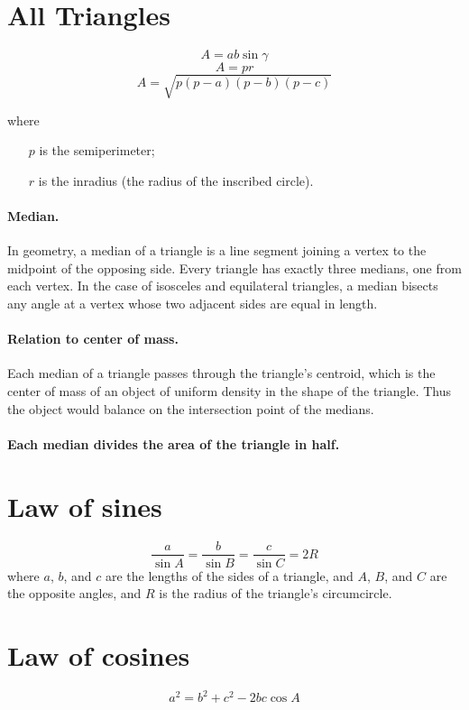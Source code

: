 \documentclass[oneside]{book}
\begin{document}
\section{All Triangles}
\[A = a b \sin \gamma \]
\[A = p r\]
\[A = \sqrt{p \left ( p - a \right ) \left ( p - b \right ) \left ( p - c
\right )}\]

where

\begin{itemize}
  \item[\(p\)] is the semiperimeter;
  \item[\(r\)] is the inradius (the radius of the inscribed circle).
\end{itemize}

\paragraph{Median.} In geometry, a median of a triangle is a line segment
joining a vertex to the midpoint of the opposing side. Every triangle has
exactly three medians, one from each vertex. In the case of isosceles and
equilateral triangles, a median bisects any angle at a vertex whose two adjacent
sides are equal in length.

\paragraph{Relation to center of mass.} Each median of a triangle passes through
the triangle's centroid, which is the center of mass of an object of uniform
density in the shape of the triangle. Thus the object would balance on the
intersection point of the medians.

\paragraph{Each median divides the area of the triangle in half.}

\section{Law of sines}
\[\frac{a}{\sin{A}} = \frac{b}{\sin{B}} = \frac{c}{\sin{C}} = 2R\]
where \(a\), \(b\), and \(c\) are the lengths of the sides of a triangle, and
\(A\), \(B\), and \(C\) are the opposite angles, and \(R\) is the radius of
the triangle's circumcircle.

\section{Law of cosines}
\[a^2 = b^2 + c^2 - 2bc\cos{A}\]
\end{document}
